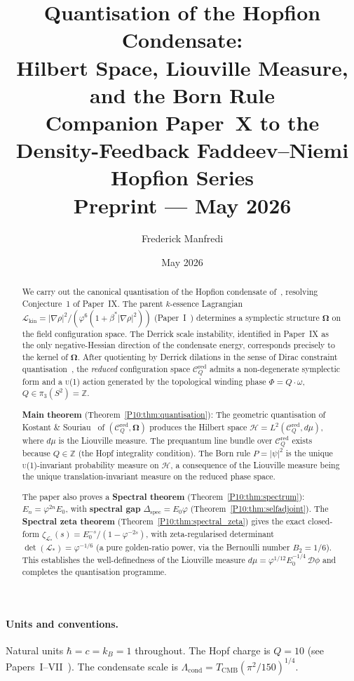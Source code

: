 \documentclass[11pt,a4paper]{article}
\title{\textbf{Quantisation of the Hopfion Condensate:\\
Hilbert Space, Liouville Measure, and the Born Rule}
\\[0.6em]
{\large Companion Paper~X to the Density-Feedback
Faddeev--Niemi Hopfion Series}
\\[0.6em]
\large Preprint --- May 2026}
\author{Frederick Manfredi}
\date{May 2026}
\theoremstyle{definition}
\theoremstyle{remark}
\newcommand{\vp}{\varphi}
\newcommand{\bst}{\beta^{*}}
\newcommand{\TCMB}{T_{\mathrm{CMB}}}
\newcommand{\Lcond}{\Lambda_{\mathrm{cond}}}
\newcommand{\ZZ}{\mathbb{Z}}
\newcommand{\Hil}{\mathcal{H}}
\newcommand{\CQr}{\mathcal{C}_Q^{\mathrm{red}}}
\newcommand{\bOmega}{\boldsymbol{\Omega}}
\newcommand{\dmu}{d\mu}
\begin{document}
\maketitle

\paragraph*{Units and conventions.}
Natural units $\hbar = c = k_B = 1$ throughout.
The Hopf charge is $Q=10$ (see Papers~I--VII~\cite{Paper1}).
The condensate scale is $\Lcond = \TCMB(\pi^2/150)^{1/4}$.

\begin{abstract}
We carry out the canonical quantisation of the Hopfion condensate
of~\cite{Paper1,Paper7,Paper9}, resolving Conjecture~1 of Paper~IX.
The parent $k$-essence Lagrangian
$\mathcal{L}_\mathrm{kin} = |\nabla\rho|^2/(\vp^6(1+\bst|\nabla\rho|^2))$
(Paper~I~\cite{Paper1}) determines a symplectic structure
$\bOmega$ on the field configuration space.
The Derrick scale instability, identified in Paper~IX as the only
negative-Hessian direction of the condensate energy, corresponds precisely
to the kernel of $\bOmega$.
After quotienting by Derrick dilations in the sense of
Dirac constraint quantisation~\cite{Dirac1950}, the
\emph{reduced} configuration space $\CQr$ admits a non-degenerate
symplectic form and a
\textsc{u}(1) action generated by the topological winding phase
$\Phi = Q\cdot\omega$, $Q\in\pi_3(S^2)=\ZZ$.

\textbf{Main theorem} (Theorem~\ref{P10:thm:quantisation}):
The geometric quantisation of Kostant \& Souriau~\cite{Kostant1970,Souriau1970} of $(\CQr,\bOmega)$
produces the Hilbert space
$\Hil = L^2(\CQr,\dmu)$,
where $\dmu$ is the Liouville measure.
The prequantum line bundle over $\CQr$ exists because $Q\in\ZZ$
(the Hopf integrality condition).
The Born rule $P=|\psi|^2$ is the unique
\textsc{u}(1)-invariant probability measure on $\Hil$,
a consequence of the Liouville measure being the unique
translation-invariant measure on the reduced phase space.

The paper also proves a \textbf{Spectral theorem}
(Theorem~\ref{P10:thm:spectrum}): $E_n = \vp^{2n}E_0$, with
\textbf{spectral gap} $\Delta_\mathrm{spec} = E_0\vp$
(Theorem~\ref{P10:thm:selfadjoint}).
The \textbf{Spectral zeta theorem} (Theorem~\ref{P10:thm:spectral_zeta})
gives the exact closed-form
$\zeta_{\mathcal{L}_*}(s) = E_0^{-s}/(1-\vp^{-2s})$,
with zeta-regularised determinant $\det(\mathcal{L}_*) = \vp^{-1/6}$
(a pure golden-ratio power, via the Bernoulli number $B_2=1/6$).
This establishes the well-definedness of the Liouville measure
$\dmu = \vp^{1/12}E_0^{-1/4}\,\mathcal{D}\phi$ and completes the
quantisation programme.


\end{abstract}
\end{document}
